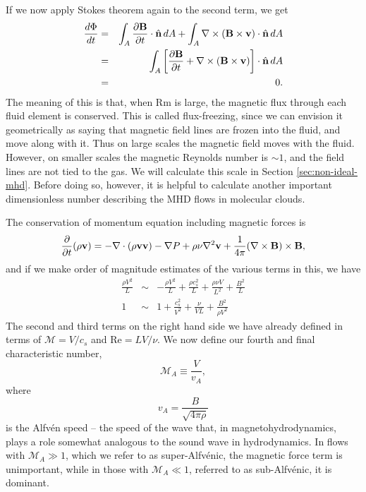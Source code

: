 If we now apply Stokes theorem again to the second term, we get
\begin{eqnarray}
\frac{d\Phi}{dt} 
& = & \int_A \frac{\partial\mathbf{B}}{\partial t}\cdot\hat{\mathbf{n}}\, dA + \int_A \nabla\times (\mathbf{B}\times \mathbf{v}) \cdot \hat{\mathbf{n}}\, dA \\
& = & \int_A \left[\frac{\partial\mathbf{B}}{\partial t} + \nabla\times (\mathbf{B}\times \mathbf{v})\right]\cdot\hat{\mathbf{n}}\,dA\\
& = & 0.
\end{eqnarray}
The meaning of this is that, when Rm is large, the magnetic flux through each fluid element is conserved. This is called flux-freezing, since we can envision it geometrically as saying that magnetic field lines are frozen into the fluid, and move along with it. Thus on large scales the magnetic field moves with the fluid. However, on smaller scales the magnetic Reynolds number is $\sim 1$, and the field lines are not tied to the gas. We will calculate this scale in Section \ref{sec:non-ideal-mhd}. Before doing so, however, it is helpful to calculate another important dimensionless number describing the MHD flows in molecular clouds.

The conservation of momentum equation including magnetic forces is
\begin{equation}
\frac{\partial}{\partial t}(\rho \mathbf{v}) = -\nabla \cdot(\rho \mathbf{v v}) - \nabla P + \rho \nu \nabla^2 \mathbf{v} + \frac{1}{4\pi} (\nabla\times\mathbf{B})\times \mathbf{B},
\end{equation}
and if we make order of magnitude estimates of the various terms in this, we have
\begin{eqnarray}
\frac{\rho V^2}{L} & \sim & -\frac{\rho V^2}{L} + \frac{\rho c_s^2}{L} + \frac{\rho \nu V}{L^2} + \frac{B^2}{L} \\
1 & \sim & 1 + \frac{c_s^2}{V^2} + \frac{\nu}{VL} + \frac{B^2}{\rho V^2}
\end{eqnarray}
The second and third terms on the right hand side we have already defined in terms of $\mathcal{M}= V/c_s$ and $\mathrm{Re} = LV/\nu$. We now define our fourth and final characteristic number,
\begin{equation}
\mathcal{M}_A \equiv \frac{V}{v_A},
\end{equation}
where
\begin{equation}
v_A = \frac{B}{\sqrt{4\pi \rho}}
\end{equation}
is the Alfv\'{e}n speed -- the speed of the wave that, in magnetohydrodynamics, plays a role somewhat analogous to the sound wave in hydrodynamics. In flows with $\mathcal{M}_A \gg 1$, which we refer to as super-Alfv\'{e}nic, the magnetic force term is unimportant, while in those with $\mathcal{M}_A \ll 1$, referred to as sub-Alfv\'{e}nic, it is dominant.

